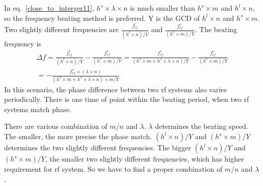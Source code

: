 In eq.~\ref{close_to_interger11}, $h^s \times\lambda\times n$ is much smaller than $h^s \times m$ and $h^l\times n$, so the frequency beating method is preferred. Y is the GCD of $h^l\times n$ and $h^s \times m$. Two slightly different frequencies are $\frac{f_{\mathit{rf}}^{l}}{(h^l\times n)/Y}$ and $\frac{f_{\mathit{rf}}^{s}}{(h^s\times m)/Y}$. The beating frequency is
\begin{equation} 
\begin{split}
\Delta f=\frac{f_{\mathit{rf}}^{l}}{(h^l\times n)/Y} - \frac{f_{\mathit{rf}}^{s}}{(h^s\times m)/Y}=\frac{f_{\mathit{rf}}^{s}}{(h^s \times m+ h^s \times\lambda\times n)/Y} - \frac{f_{\mathit{rf}}^{s}}{(h^s\times m)/Y}\\=-\frac{f_{\mathit{rf}}^{s}\times(\lambda\times n)}{(h^s \times m+ h^s \times\lambda\times n) \times m/Y} 
\end{split}
\end{equation}
In this scenario, the phase difference between two rf systems also varies periodically. There is one time of point within the beating period, when two rf systems match phase. 

There are various combination of $m/n$ and $\lambda$. $\lambda$ determines the beating speed. The smaller, the more precise the phase match. $(h^l\times n)/Y$ and $(h^s\times m)/Y$ determines the two slightly different frequencies. The bigger $(h^l\times n)/Y$ and $(h^s\times m)/Y$, the smaller two slightly different frequencies, which has higher requirement for rf system. So we have to find a proper combination of $m/n$ and $\lambda$.



%

  
